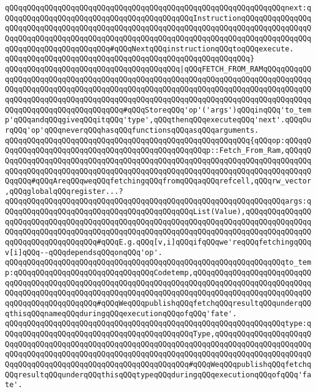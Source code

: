 \verb|qQQqqQQqqQQqqQQqqQQqqQQqqQQqqQQqqQQqqQQqqQQqqQQqqQQqqQQqqQQqqQQqnext:qQQqqQQqqQQqqQQqqQQqqQQqqQQqqQQqqQQqqQQqqQQqInstructionqQQqqQQqqQQqqQQqqQQqqQQqqQQqqQQqqQQqqQQqqQQqqQQqqQQqqQQqqQQqqQQqqQQqqQQqqQQqqQQqqQQqqQQqqQQqqQQqqQQqqQQqqQQqqQQqqQQqqQQqqQQqqQQqqQQqqQQqqQQqqQQqqQQqqQQqqQQqqQQqqQQqqQQqqQQqqQQqqQQq#qQQqNextqQQqinstructionqQQqtoqQQqexecute.|\newline
\verb|qQQqqQQqqQQqqQQqqQQqqQQqqQQqqQQqqQQqqQQqqQQqqQQqqQQqqQQq}|\newline
\newline
\verb|qQQqqQQqqQQqqQQqqQQqqQQqqQQqqQQqqQQqqQQq|\verb#|qQQqFETCH_FROM_RAMqQQqqQQqqQQqqQQqqQQqqQQqqQQqqQQqqQQqqQQqqQQqqQQqqQQqqQQqqQQqqQQqqQQqqQQqqQQqqQQqqQQqqQQqqQQqqQQqqQQqqQQqqQQqqQQqqQQqqQQqqQQqqQQqqQQqqQQqqQQqqQQqqQQqqQQqqQQqqQQqqQQqqQQqqQQqqQQqqQQqqQQqqQQqqQQqqQQqqQQqqQQqqQQqqQQqqQQqqQQqqQQqqQQqqQQqqQQqqQQqqQQqqQQq#\verb|#qQQqStoreqQQq'op'('args')qQQqinqQQq'to_temp'qQQqandqQQqgiveqQQqitqQQq'type',qQQqthenqQQqexecuteqQQq'next'.qQQqOurqQQq'op'qQQqneverqQQqhasqQQqfunctionsqQQqasqQQqarguments.|\newline
\verb|qQQqqQQqqQQqqQQqqQQqqQQqqQQqqQQqqQQqqQQqqQQqqQQqqQQqqQQq{qQQqop:qQQqqQQqqQQqqQQqqQQqqQQqqQQqqQQqqQQqqQQqqQQqqQQqqQQqp::Fetch_From_Ram,qQQqqQQqqQQqqQQqqQQqqQQqqQQqqQQqqQQqqQQqqQQqqQQqqQQqqQQqqQQqqQQqqQQqqQQqqQQqqQQqqQQqqQQqqQQqqQQqqQQqqQQqqQQqqQQqqQQqqQQqqQQqqQQqqQQqqQQqqQQqqQQqqQQqqQQq#qQQqAreqQQqweqQQqfetchingqQQqfromqQQqaqQQqrefcell,qQQqrw_vector,qQQqglobalqQQqregister...?|\newline
\verb|qQQqqQQqqQQqqQQqqQQqqQQqqQQqqQQqqQQqqQQqqQQqqQQqqQQqqQQqqQQqqQQqargs:qQQqqQQqqQQqqQQqqQQqqQQqqQQqqQQqqQQqqQQqqQQqList(Value),qQQqqQQqqQQqqQQqqQQqqQQqqQQqqQQqqQQqqQQqqQQqqQQqqQQqqQQqqQQqqQQqqQQqqQQqqQQqqQQqqQQqqQQqqQQqqQQqqQQqqQQqqQQqqQQqqQQqqQQqqQQqqQQqqQQqqQQqqQQqqQQqqQQqqQQqqQQqqQQqqQQqqQQqqQQqqQQq#qQQqE.g.qQQq[v,i]qQQqifqQQqwe'reqQQqfetchingqQQqv[i]qQQq--qQQqdependsqQQqonqQQq'op'.|\newline
\verb|qQQqqQQqqQQqqQQqqQQqqQQqqQQqqQQqqQQqqQQqqQQqqQQqqQQqqQQqqQQqqQQqto_temp:qQQqqQQqqQQqqQQqqQQqqQQqqQQqqQQqCodetemp,qQQqqQQqqQQqqQQqqQQqqQQqqQQqqQQqqQQqqQQqqQQqqQQqqQQqqQQqqQQqqQQqqQQqqQQqqQQqqQQqqQQqqQQqqQQqqQQqqQQqqQQqqQQqqQQqqQQqqQQqqQQqqQQqqQQqqQQqqQQqqQQqqQQqqQQqqQQqqQQqqQQqqQQqqQQqqQQqqQQqqQQqqQQq#qQQqWeqQQqpublishqQQqfetchqQQqresultqQQqunderqQQqthisqQQqnameqQQqduringqQQqexecutionqQQqofqQQq'fate'.|\newline
\verb|qQQqqQQqqQQqqQQqqQQqqQQqqQQqqQQqqQQqqQQqqQQqqQQqqQQqqQQqqQQqqQQqtype:qQQqqQQqqQQqqQQqqQQqqQQqqQQqqQQqqQQqqQQqqQQqType,qQQqqQQqqQQqqQQqqQQqqQQqqQQqqQQqqQQqqQQqqQQqqQQqqQQqqQQqqQQqqQQqqQQqqQQqqQQqqQQqqQQqqQQqqQQqqQQqqQQqqQQqqQQqqQQqqQQqqQQqqQQqqQQqqQQqqQQqqQQqqQQqqQQqqQQqqQQqqQQqqQQqqQQqqQQqqQQqqQQqqQQqqQQqqQQqqQQqqQQqqQQq#qQQqWeqQQqpublishqQQqfetchqQQqresultqQQqunderqQQqthisqQQqtypeqQQqduringqQQqexecutionqQQqofqQQq'fate'.|\newline
